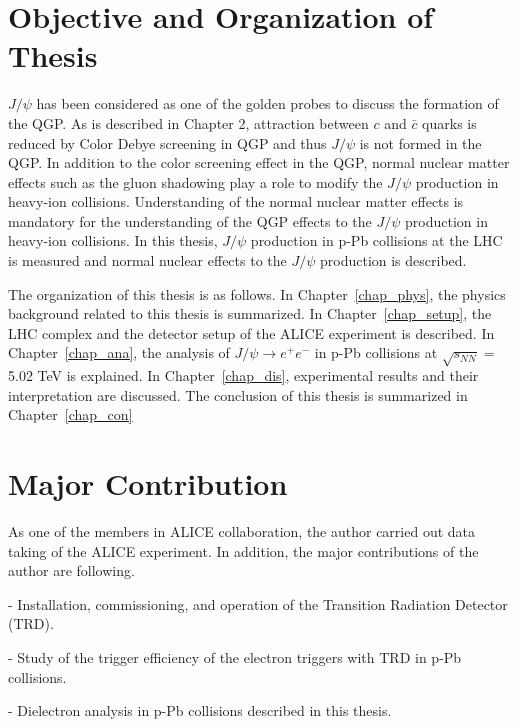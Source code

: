 \section{Objective and Organization of Thesis}
$J/\psi$ has been considered as one of the golden probes to discuss the formation of the QGP.
As is described in Chapter 2, attraction between $c$ and $\bar{c}$ quarks is reduced by Color Debye screening in QGP and thus $J/\psi$ is not formed in the QGP.
In addition to the color screening effect in the QGP, normal nuclear matter effects such as the gluon shadowing play a role to modify the $J/\psi$ production in heavy-ion collisions. 
Understanding of the normal nuclear matter effects is mandatory for the understanding of the QGP effects to the $J/\psi$ production in heavy-ion collisions.
In this thesis, $J/\psi$ production in p-Pb collisions at the LHC is measured and normal nuclear effects to the $J/\psi$ production is described.

The organization of this thesis is as follows.  
In Chapter~\ref{chap_phys}, the physics background related to this thesis is summarized. 
In Chapter~\ref{chap_setup}, the LHC complex and the detector setup of the ALICE experiment is described. 
In Chapter~\ref{chap_ana}, the analysis of $J/\psi\rightarrow e^{+}e^{-}$ in p-Pb collisions at $\sqrt{s_{NN}}=$5.02 TeV is explained. 
In Chapter~\ref{chap_dis}, experimental results and their interpretation are discussed. 
The conclusion of this thesis is summarized in Chapter~\ref{chap_con}

\section{Major Contribution}
As one of the members in ALICE collaboration, the author carried out data taking of the ALICE experiment. 
In addition, the major contributions of the author are following. 
\begin{description}
  \item{-} Installation, commissioning, and operation of the Transition Radiation Detector (TRD).
  \item{-} Study of the trigger efficiency of the electron triggers with TRD in p-Pb collisions.
  \item{-} Dielectron analysis in p-Pb collisions described in this thesis.
\end{description}



